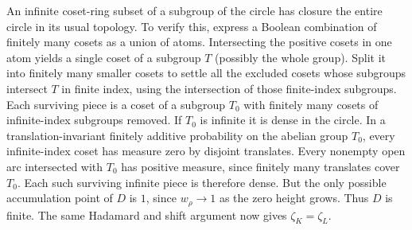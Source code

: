 An infinite coset-ring subset of a subgroup of the circle has closure
the entire circle in its usual topology. To verify this, express a
Boolean combination of finitely many cosets as a union of atoms.
Intersecting the positive cosets in one atom yields a single coset
of a subgroup $T$ (possibly the whole group). Split it into finitely
many smaller cosets to settle all the excluded cosets whose subgroups
intersect $T$ in finite index, using the intersection of those
finite-index subgroups. Each surviving piece is a coset of a subgroup
$T_0$ with finitely many cosets of infinite-index subgroups removed.
If $T_0$ is infinite it is dense in the circle. In a
translation-invariant finitely additive probability on the abelian
group $T_0$, every infinite-index coset has measure zero by disjoint
translates. Every nonempty open arc intersected with $T_0$ has positive
measure, since finitely many translates cover $T_0$. Each such
surviving infinite piece is therefore dense. But the only possible
accumulation point of $D$ is $1$, since $w_\rho\to1$ as the zero
height grows. Thus $D$ is finite. The same Hadamard and shift argument
now gives $\zeta_K=\zeta_L$.
